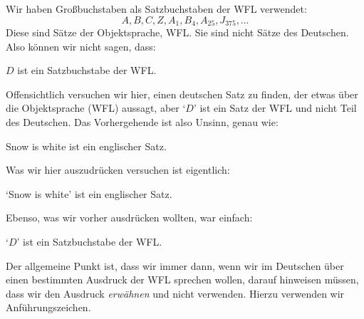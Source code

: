 Wir haben Gro{\ss}buchstaben als Satzbuchstaben der WFL verwendet:
	$$A, B, C, Z, A_1, B_4, A_{25}, J_{375},\ldots$$
Diese sind Sätze der Objektsprache, WFL. Sie sind nicht Sätze des Deutschen. Also können wir nicht sagen, dass:
	\begin{ebullet}
		\item $D$ ist ein Satzbuchstabe der WFL.
	\end{ebullet}
Offensichtlich versuchen wir hier, einen deutschen Satz zu finden, der etwas über die Objektsprache (WFL) aussagt, aber `$D$' ist ein Satz der WFL und nicht Teil des Deutschen. Das Vorhergehende ist also Unsinn, genau wie:
	\begin{ebullet}
		\item Snow is white ist ein englischer Satz.
	\end{ebullet}
Was wir hier auszudrücken versuchen ist eigentlich:
	\begin{ebullet}
		\item `Snow is white' ist ein englischer Satz.
	\end{ebullet}
Ebenso, was wir vorher ausdrücken wollten, war einfach:
	\begin{ebullet}
		\item `$D$' ist ein Satzbuchstabe der WFL.
	\end{ebullet}
Der allgemeine Punkt ist, dass wir immer dann, wenn wir im Deutschen über einen bestimmten Ausdruck der WFL sprechen wollen, darauf hinweisen müssen, dass wir den Ausdruck \emph{erwähnen} und nicht verwenden. Hierzu verwenden wir Anführungszeichen.

